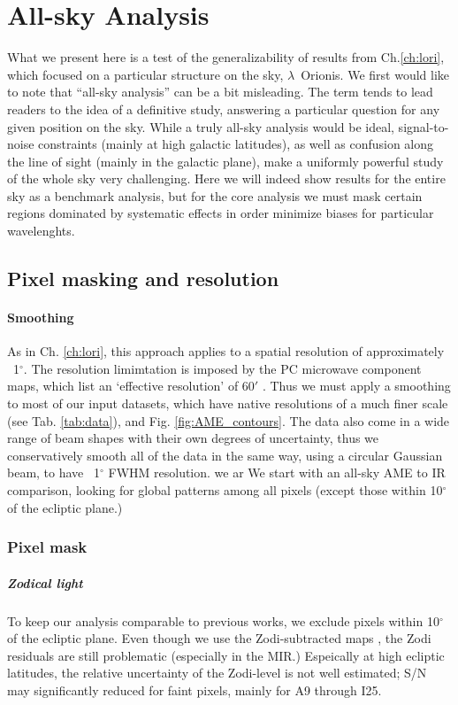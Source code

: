 \chapter{All-sky Analysis}
  \label{sec:analysis}

    What we present here is a test of the generalizability of results from Ch.\ref{ch:lori}, which focused on a particular structure on the sky, $\lambda$~Orionis.
    We first would like to note that ``all-sky analysis'' can be a bit misleading. The term tends to lead readers to the idea of a definitive study, answering a particular question for any given position on the sky.  While a truly all-sky analysis would be ideal, signal-to-noise constraints (mainly at high galactic latitudes), as well as confusion along the line of sight (mainly in the galactic plane), make a uniformly powerful study of the whole sky very challenging. Here we will indeed show results for the entire sky as a benchmark analysis, but for the core analysis we must mask certain regions dominated by systematic effects in order minimize biases for particular wavelenghts.

\section{Pixel masking and resolution}
    \subsubsection{Smoothing}
        As in Ch. \ref{ch:lori}, this approach applies to a spatial resolution of approximately ~1$^{\circ}$. The resolution limimtation is imposed by the PC microwave component maps, which list an `effective resolution' of 60$'$ \citep{planck15X}. Thus we must apply a smoothing to most of our input datasets, which have native resolutions of a much finer scale (see Tab. \ref{tab:data}), and Fig. \ref{fig:AME_contours}. The data also come in a wide range of beam shapes with their own degrees of uncertainty, thus we conservatively smooth all of the data in the same way, using a circular Gaussian beam, to have ~1$^{\circ}$ FWHM resolution. we ar We start with an all-sky AME to IR comparison, looking for global patterns among all pixels (except those within 10$^{\circ}$ of the ecliptic plane.)
    \subsection{Pixel mask}
      \paragraph{Zodical light}
        To keep our analysis comparable to previous works, we exclude pixels within 10$^{\circ}$ of the ecliptic plane. Even though we use the Zodi-subtracted maps \citep{kelsall98, kondo16}, the Zodi residuals are still problematic (especially in the MIR.) Espeically at high ecliptic latitudes, the relative uncertainty of the Zodi-level is not well estimated; S/N may significantly reduced for faint pixels, mainly for A9 through I25.
